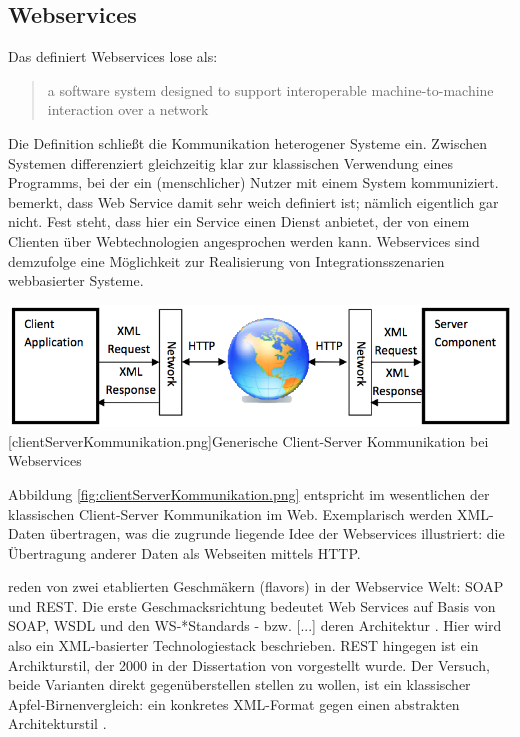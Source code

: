 \documentclass[12pt,a4paper,bibliography=totocnumbered,listof=totoc]{scrartcl}
\begin{document}
\pagebreak
\subsection{Webservices}

Das \citet	{w3c04} definiert Webservices lose als:

\begin{quote}
\glqq [...] a software system designed to support interoperable machine-to-machine interaction over a network\grqq
\end{quote}

Die Definition schließt die Kommunikation heterogener Systeme ein. \glqq Zwischen Systemen\grqq{} differenziert gleichzeitig klar zur klassischen Verwendung eines Programms, bei der ein (menschlicher) Nutzer mit einem System kommuniziert. \citet{tilkov11} bemerkt, dass Web Service damit sehr weich definiert ist; \glqq nämlich eigentlich gar nicht\grqq{}. Fest steht, dass hier ein Service einen Dienst anbietet, der von einem Clienten über Webtechnologien angesprochen werden kann. Webservices sind demzufolge eine Möglichkeit zur Realisierung von Integrationsszenarien webbasierter Systeme.

\vspace{1em}
\begin{minipage}{\linewidth}
	\centering
	\includegraphics[width=0.7\linewidth]{Abbildungen/clientServerKommunikation.png}
	[clientServerKommunikation.png]{Generische Client-Server Kommunikation bei Webservices}
	\label{fig:clientServerKommunikation.png}
\end{minipage}
\vspace{1em}

Abbildung \ref{fig:clientServerKommunikation.png} entspricht im wesentlichen der klassischen Client-Server Kommunikation im Web. Exemplarisch werden XML-Daten übertragen, was die zugrunde liegende Idee der Webservices illustriert: die Übertragung anderer Daten als Webseiten mittels HTTP.

\citet{wilde11} reden von zwei etablierten \glqq Geschmäkern\grqq{} (flavors) in der Webservice Welt: SOAP und REST. Die erste Geschmacksrichtung bedeutet Web Services \glqq auf Basis von SOAP, WSDL und den WS-*Standards - bzw. [...] deren Architektur\grqq{} \citep{tilkov11}. Hier wird also ein XML-basierter Technologiestack beschrieben. REST hingegen ist ein Archikturstil, der 2000 in der Dissertation von \citeauthor{fielding00} vorgestellt wurde. Der Versuch, beide Varianten direkt gegenüberstellen stellen zu wollen, ist ein \glqq [...] klassischer Apfel-Birnenvergleich: ein konkretes XML-Format gegen einen abstrakten Architekturstil\grqq{} \citep{tilkov11}.
\end{document}
